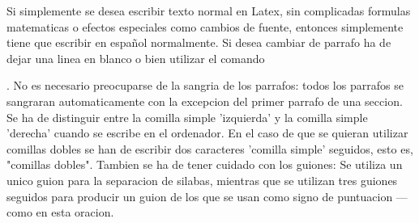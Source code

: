 \documentclass[a4paper,10pt]{letter}
\begin{document}
Si simplemente se desea escribir texto normal en Latex,
sin complicadas formulas matematicas o efectos especiales
como cambios de fuente, entonces simplemente tiene que escribir
en español normalmente.
Si desea cambiar de parrafo ha de dejar una linea en blanco o bien
utilizar el comando \par.
No es necesario preocuparse de la sangria de los parrafos:
todos los parrafos se sangraran automaticamente con la excepcion 
del primer parrafo de una seccion.
Se ha de distinguir entre la comilla simple 'izquierda'
y la comilla simple 'derecha' cuando se escribe en el ordenador.
En el caso de que se quieran utilizar comillas dobles se han de 
escribir dos caracteres 'comilla simple' seguidos, esto es,
"comillas dobles".
Tambien se ha de tener cuidado con los guiones: Se utiliza un unico
guion para la separacion de silabas, mientras que se utilizan 
tres guiones seguidos para producir un guion de los que se usan
como signo de puntuacion --- como en esta oracion.
\end{document}

